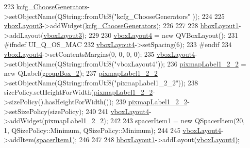 \begin{DoxyCode}
223         \hyperlink{classUi__DlgGeneralBase_ad63d50a9664ae9d855e43ac1a95e3629}{kcfg\_ChooseGenerators}->setObjectName(QString::fromUtf8(\textcolor{stringliteral}{"kcfg\_ChooseGenerators"}
      ));
224 
225         \hyperlink{classUi__DlgGeneralBase_a457d320b774578a19aeb92dbe19f128e}{vboxLayout3}->addWidget(\hyperlink{classUi__DlgGeneralBase_ad63d50a9664ae9d855e43ac1a95e3629}{kcfg\_ChooseGenerators});
226 
227 
228         \hyperlink{classUi__DlgGeneralBase_a2db865b00918e93123eb63bf71b083d2}{hboxLayout1}->addLayout(\hyperlink{classUi__DlgGeneralBase_a457d320b774578a19aeb92dbe19f128e}{vboxLayout3});
229 
230         \hyperlink{classUi__DlgGeneralBase_a860af4a09b00b3bd9ab821e64a5aaa18}{vboxLayout4} = \textcolor{keyword}{new} QVBoxLayout();
231 \textcolor{preprocessor}{#ifndef UI\_Q\_OS\_MAC}
232         \hyperlink{classUi__DlgGeneralBase_a860af4a09b00b3bd9ab821e64a5aaa18}{vboxLayout4}->setSpacing(6);
233 \textcolor{preprocessor}{#endif}
234         \hyperlink{classUi__DlgGeneralBase_a860af4a09b00b3bd9ab821e64a5aaa18}{vboxLayout4}->setContentsMargins(0, 0, 0, 0);
235         \hyperlink{classUi__DlgGeneralBase_a860af4a09b00b3bd9ab821e64a5aaa18}{vboxLayout4}->setObjectName(QString::fromUtf8(\textcolor{stringliteral}{"vboxLayout4"}));
236         \hyperlink{classUi__DlgGeneralBase_abf82683d25a444dcffa83917ac9f75a4}{pixmapLabel1\_2\_2} = \textcolor{keyword}{new} QLabel(\hyperlink{classUi__DlgGeneralBase_ae822e688fc0f616b4a29511bc5615a3d}{groupBox\_2});
237         \hyperlink{classUi__DlgGeneralBase_abf82683d25a444dcffa83917ac9f75a4}{pixmapLabel1\_2\_2}->setObjectName(QString::fromUtf8(\textcolor{stringliteral}{"pixmapLabel1\_2\_2"}));
238         sizePolicy.setHeightForWidth(\hyperlink{classUi__DlgGeneralBase_abf82683d25a444dcffa83917ac9f75a4}{pixmapLabel1\_2\_2}->sizePolicy().hasHeightForWidth());
239         \hyperlink{classUi__DlgGeneralBase_abf82683d25a444dcffa83917ac9f75a4}{pixmapLabel1\_2\_2}->setSizePolicy(sizePolicy);
240 
241         \hyperlink{classUi__DlgGeneralBase_a860af4a09b00b3bd9ab821e64a5aaa18}{vboxLayout4}->addWidget(\hyperlink{classUi__DlgGeneralBase_abf82683d25a444dcffa83917ac9f75a4}{pixmapLabel1\_2\_2});
242 
243         \hyperlink{classUi__DlgGeneralBase_a226899c716df5b8ce150c996cd8059c4}{spacerItem1} = \textcolor{keyword}{new} QSpacerItem(20, 1, QSizePolicy::Minimum, QSizePolicy::Minimum);
244 
245         \hyperlink{classUi__DlgGeneralBase_a860af4a09b00b3bd9ab821e64a5aaa18}{vboxLayout4}->addItem(\hyperlink{classUi__DlgGeneralBase_a226899c716df5b8ce150c996cd8059c4}{spacerItem1});
246 
247 
248         \hyperlink{classUi__DlgGeneralBase_a2db865b00918e93123eb63bf71b083d2}{hboxLayout1}->addLayout(\hyperlink{classUi__DlgGeneralBase_a860af4a09b00b3bd9ab821e64a5aaa18}{vboxLayout4});

\end{DoxyCode}
